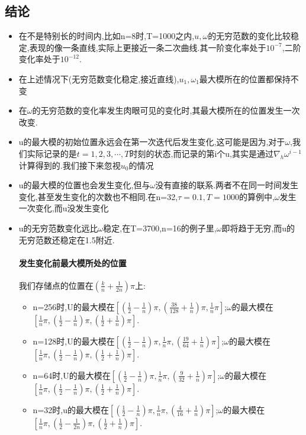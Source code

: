 \documentclass[UTF8]{ctexart}
\begin{document}
\subsection{结论}
\begin{itemize}
\item  在不是特别长的时间内,比如n=8时,T=1000之内,$u,\omega$的无穷范数的变化比较稳定,表现的像一条直线,实际上更接近一条二次曲线.其一阶变化率处于$10^{-7}$,二阶变化率处于$10^{-12}$.
\item 在上述情况下(无穷范数变化稳定,接近直线),$u_1,\omega_1$最大模所在的位置都保持不变
\item 在$\omega$的无穷范数的变化率发生肉眼可见的变化时,其最大模所在的位置发生一次改变.
\item u的最大模的初始位置永远会在第一次迭代后发生变化,这可能是因为,对于$\omega$,我们实际记录的是$t=1,2,3,\cdots,T$时刻的状态,而记录的第i个u,其实是通过$\nabla_h \omega^{i-1}$计算得到的.我们接下来忽视$u_0$的情况
\item u的最大模的位置也会发生变化,但与$\omega$没有直接的联系.两者不在同一时间发生变化,甚至发生变化的次数也不相同.在n=32,$\tau=0.1,T=1000$的算例中,$\omega$发生一次变化,而u没发生变化
\item u的无穷范数变化远比$\omega$稳定,在T=3700,n=16的例子里,$\omega$即将趋于无穷,而u的无穷范数还稳定在1.5附近.
\paragraph{发生变化前最大模所处的位置}
我们存储点的位置在$(\frac{k}{n}+\frac{1}{2n})\pi$上:
\begin{itemize}
\item n=256时,U的最大模在$[(\frac{1}{2}-\frac{1}{n})\pi, (\frac{38}{128}+\frac{1}{n})\pi,\frac{1}{n}\pi]$;$\omega$的最大模在$[\frac{1}{n}\pi,(\frac{1}{2}-\frac{1}{n})\pi,(\frac{1}{2}+\frac{1}{n})\pi]$.
\item n=128时,U的最大模在$[(\frac{1}{2}-\frac{1}{n})\pi,\frac{1}{n}\pi, (\frac{19}{64}+\frac{1}{n})\pi]$;$\omega$的最大模在$[\frac{1}{n}\pi,(\frac{1}{2}-\frac{1}{n})\pi,(\frac{1}{2}+\frac{1}{n})\pi]$.
\item n=64时,U的最大模在$[(\frac{1}{2}-\frac{1}{n})\pi,\frac{1}{n}\pi, (\frac{9}{32}+\frac{1}{n})\pi]$;$\omega$的最大模在$[\frac{1}{n}\pi,(\frac{1}{2}-\frac{1}{n})\pi,(\frac{1}{2}+\frac{1}{n})\pi]$.
\item n=32时,u的最大模在$[(\frac{1}{2}-\frac{1}{n})\pi,\frac{1}{n}\pi, (\frac{4}{16}+\frac{1}{n})\pi]$;$\omega$的最大模在$[\frac{1}{n}\pi,(\frac{1}{2}-\frac{1}{2n})\pi,(\frac{1}{2}+\frac{1}{n})\pi]$.
\end{itemize}





\end{itemize}
\end{document}
